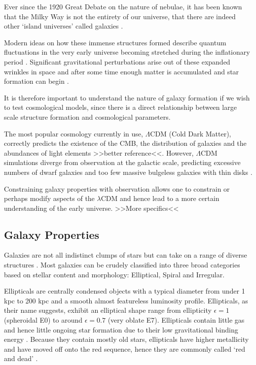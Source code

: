 Ever since the 1920 Great Debate on the nature of nebulae, it has been known that the Milky Way is not the entirety of our universe, that there are indeed other `island universes' called galaxies \citep{berendzen_man_1976}. 

Modern ideas on how these immense structures formed describe quantum fluctuations in the very early universe becoming stretched during the inflationary period \citep{liddle_introduction_2003}. Significant gravitational perturbations arise out of these expanded wrinkles in space and after some time enough matter is accumulated and star formation can begin \citep{coles_cosmology:_2002}.

It is therefore important to understand the nature of galaxy formation if we wish to test cosmological models, since there is a direct relationship between large scale structure formation and cosmological parameters.

The most popular cosmology currently in use, $\Lambda$CDM (Cold Dark Matter), correctly predicts the existence of the CMB, the distribution of galaxies and the abundances of light elements \citep{liddle_introduction_2003} >>better reference<<. However, $\Lambda$CDM simulations diverge from observation at the galactic scale, predicting excessive numbers of dwarf galaxies \citep{silk_massive-black-hole-velocity-dispersion_2010} and too few massive bulgeless galaxies with thin disks \citep{kormendy_bulgeless_2010}.

Constraining galaxy properties with observation allows one to constrain or perhaps modify aspects of the $\lambda$CDM and hence lead to a more certain understanding of the early universe. >>More specifics<<

\subsection{Galaxy Properties}
Galaxies are not all indistinct clumps of stars but can take on a range of diverse structures \citep{hubble_no._1926}. Most galaxies can be crudely classified into three broad categories based on stellar content and morphology: Elliptical, Spiral and Irregular. 

Ellipticals are centrally condensed objects with a typical diameter from under 1 kpc to 200 kpc \citep{carroll_introduction_2007} and a smooth almost featureless luminosity profile. Ellipticals, as their name suggests, exhibit an elliptical shape range from ellipticity $\epsilon = 1$ (spheroidal E0) to around $\epsilon = 0.7$ (very oblate E7). 
Ellipticals contain little gas and hence little ongoing star formation due to their low gravitational binding energy \citep{crocker_molecular_2011}. 
Because they contain mostly old stars, ellipticals have higher metallicity and have moved off onto the red sequence, hence they are commonly called `red and dead' \citep{binney_galactic_1998}.  

